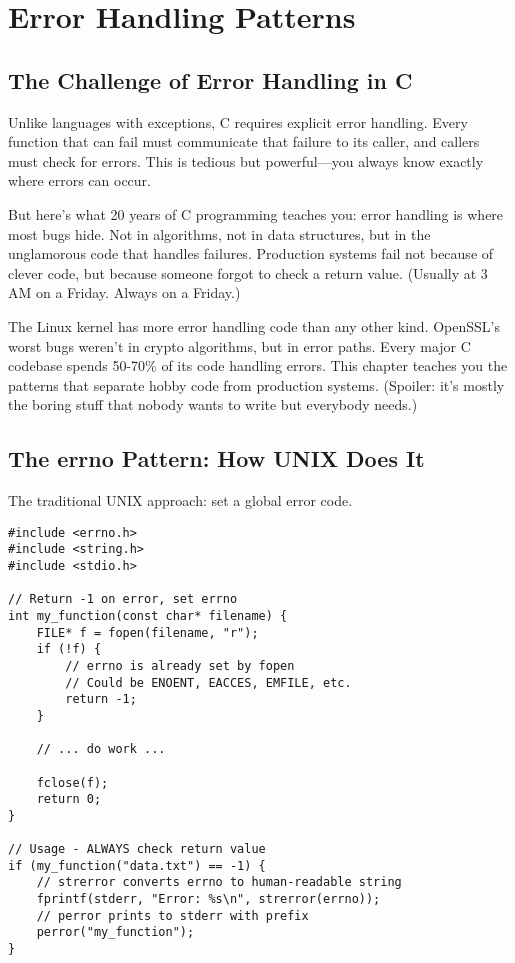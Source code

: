 \chapter{Error Handling Patterns}

\section{The Challenge of Error Handling in C}

Unlike languages with exceptions, C requires explicit error handling. Every function that can fail must communicate that failure to its caller, and callers must check for errors. This is tedious but powerful—you always know exactly where errors can occur.

But here's what 20 years of C programming teaches you: error handling is where most bugs hide. Not in algorithms, not in data structures, but in the unglamorous code that handles failures. Production systems fail not because of clever code, but because someone forgot to check a return value. (Usually at 3 AM on a Friday. Always on a Friday.)

The Linux kernel has more error handling code than any other kind. OpenSSL's worst bugs weren't in crypto algorithms, but in error paths. Every major C codebase spends 50-70\% of its code handling errors. This chapter teaches you the patterns that separate hobby code from production systems. (Spoiler: it's mostly the boring stuff that nobody wants to write but everybody needs.)

\section{The errno Pattern: How UNIX Does It}

The traditional UNIX approach: set a global error code.

\begin{lstlisting}
#include <errno.h>
#include <string.h>
#include <stdio.h>

// Return -1 on error, set errno
int my_function(const char* filename) {
    FILE* f = fopen(filename, "r");
    if (!f) {
        // errno is already set by fopen
        // Could be ENOENT, EACCES, EMFILE, etc.
        return -1;
    }

    // ... do work ...

    fclose(f);
    return 0;
}

// Usage - ALWAYS check return value
if (my_function("data.txt") == -1) {
    // strerror converts errno to human-readable string
    fprintf(stderr, "Error: %s\n", strerror(errno));
    // perror prints to stderr with prefix
    perror("my_function");
}
\end{lstlisting}

